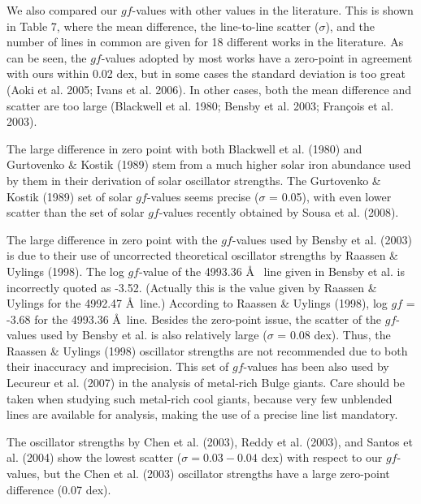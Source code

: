 \documentclass[traditabstract]{aa} %
\begin{document}
We also compared our $gf$-values with other values
in the literature. This is shown in Table 7,
where the mean difference, the line-to-line scatter ($\sigma$),
and the number of lines in common are given for 18
different works in the literature. As can be seen,
the $gf$-values adopted by most works have a zero-point 
in agreement with ours within 0.02 dex, but in
some cases the standard deviation is too great
(Aoki et al. 2005; Ivans et al. 2006). In other
cases, both the mean difference and scatter are
too large (Blackwell et al. 1980; Bensby et al. 2003; 
Fran\c cois et al. 2003). 

The large difference in zero point with both Blackwell et al. (1980) 
and Gurtovenko \& Kostik (1989) stem from a much
higher solar iron abundance used by them in
their derivation of solar oscillator strengths.
The Gurtovenko \& Kostik (1989) set
of solar $gf$-values seems precise
($\sigma$ = 0.05), with even lower scatter than
the set of solar $gf$-values recently obtained by Sousa et al. (2008).

The large difference in zero point with the
$gf$-values used by Bensby et al. (2003) is
due to their use of uncorrected theoretical oscillator
strengths by Raassen \& Uylings (1998). 
The log $gf$-value of the 4993.36 \AA\  line
given in Bensby et al. is incorrectly quoted as 
-3.52. (Actually this is the value given by
Raassen \& Uylings for the 4992.47 \AA\ line.)
According to Raassen \& Uylings (1998), log $gf$ = -3.68 for the
4993.36 \AA\ line. Besides the zero-point issue, the
scatter of the $gf$-values used by
Bensby et al. is also relatively large ($\sigma$ = 0.08 dex).
Thus, the Raassen \& Uylings (1998) oscillator strengths 
are not recommended due to both their inaccuracy and imprecision.
This set of $gf$-values has been also used by
Lecureur et al. (2007) in the analysis of metal-rich
Bulge giants. Care should be taken when studying such
metal-rich cool giants, because very few unblended  lines are available
for analysis, making the use of a precise line list mandatory.

The oscillator strengths by Chen et al. (2003),
Reddy et al. (2003), and Santos et al. (2004) show
the lowest scatter ($\sigma = 0.03-0.04$ dex) with
respect to our $gf$-values, but the 
Chen et al. (2003) oscillator strengths have a large zero-point
difference (0.07 dex).
\end{document}
